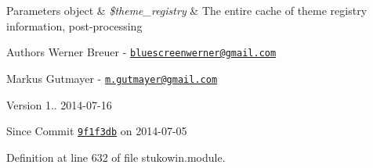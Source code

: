 \begin{DoxyParams}[1]{Parameters}
object & {\em \$theme\+\_\+registry} & The entire cache of theme registry information, post-\/processing\\
\hline
\end{DoxyParams}
\begin{DoxyAuthor}{Authors}
Werner Breuer -\/ \href{mailto:bluescreenwerner@gmail.com}{\tt bluescreenwerner@gmail.\+com} 

Markus Gutmayer -\/ \href{mailto:m.gutmayer@gmail.com}{\tt m.\+gutmayer@gmail.\+com} 
\end{DoxyAuthor}
\begin{DoxyVersion}{Version}
1.. 2014-\/07-\/16 
\end{DoxyVersion}
\begin{DoxySince}{Since}
Commit \href{http://github.com/TheJake123/DrupalModul/commit/9f1f3db3b94f0c44518af0f58401bac46f41d7cb}{\tt 9f1f3db} on 2014-\/07-\/05 
\end{DoxySince}


Definition at line 632 of file stukowin.\+module.

